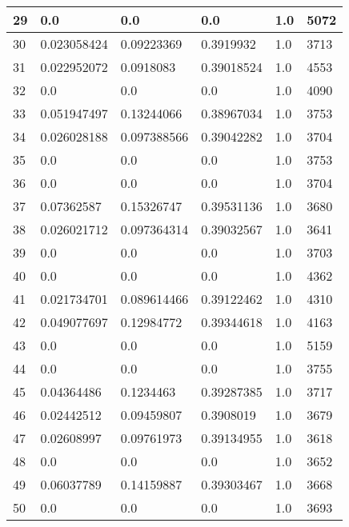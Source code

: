 \begin{longtable}{|l|l|l|l|l|l|}
29 & 0.0 & 0.0 & 0.0 & 1.0 & 5072 \\ \hline 
30 & 0.023058424 & 0.09223369 & 0.3919932 & 1.0 & 3713 \\ \hline 
31 & 0.022952072 & 0.0918083 & 0.39018524 & 1.0 & 4553 \\ \hline 
32 & 0.0 & 0.0 & 0.0 & 1.0 & 4090 \\ \hline 
33 & 0.051947497 & 0.13244066 & 0.38967034 & 1.0 & 3753 \\ \hline 
34 & 0.026028188 & 0.097388566 & 0.39042282 & 1.0 & 3704 \\ \hline 
35 & 0.0 & 0.0 & 0.0 & 1.0 & 3753 \\ \hline 
36 & 0.0 & 0.0 & 0.0 & 1.0 & 3704 \\ \hline 
37 & 0.07362587 & 0.15326747 & 0.39531136 & 1.0 & 3680 \\ \hline 
38 & 0.026021712 & 0.097364314 & 0.39032567 & 1.0 & 3641 \\ \hline 
39 & 0.0 & 0.0 & 0.0 & 1.0 & 3703 \\ \hline 
40 & 0.0 & 0.0 & 0.0 & 1.0 & 4362 \\ \hline 
41 & 0.021734701 & 0.089614466 & 0.39122462 & 1.0 & 4310 \\ \hline 
42 & 0.049077697 & 0.12984772 & 0.39344618 & 1.0 & 4163 \\ \hline 
43 & 0.0 & 0.0 & 0.0 & 1.0 & 5159 \\ \hline 
44 & 0.0 & 0.0 & 0.0 & 1.0 & 3755 \\ \hline 
45 & 0.04364486 & 0.1234463 & 0.39287385 & 1.0 & 3717 \\ \hline 
46 & 0.02442512 & 0.09459807 & 0.3908019 & 1.0 & 3679 \\ \hline 
47 & 0.02608997 & 0.09761973 & 0.39134955 & 1.0 & 3618 \\ \hline 
48 & 0.0 & 0.0 & 0.0 & 1.0 & 3652 \\ \hline 
49 & 0.06037789 & 0.14159887 & 0.39303467 & 1.0 & 3668 \\ \hline 
50 & 0.0 & 0.0 & 0.0 & 1.0 & 3693 \\ \hline 
\end{longtable}